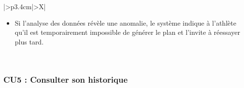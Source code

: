 ﻿\documentclass[a4paper,12pt]{report}
\begin{document}
\begin{table}[H]
\begin{tabularx}{\textwidth}{|>{\RaggedRight\arraybackslash}p{3.4cm}|>{\RaggedRight\arraybackslash}X|}
\begin{minipage}[t]{\linewidth}
\begin{itemize}[leftmargin=*, topsep=0pt, itemsep=1pt]
\item Si l’analyse des données révèle une anomalie, le système indique à l’athlète qu’il est temporairement impossible de générer le plan et l’invite à réessayer plus tard.
                                                                                        \end{itemize}
\vspace{2pt}
\end{minipage} \\
\hline
\end{tabularx}
\fussy
\end{table}

\subsubsection*{CU5 : Consulter son historique}
\end{document}
